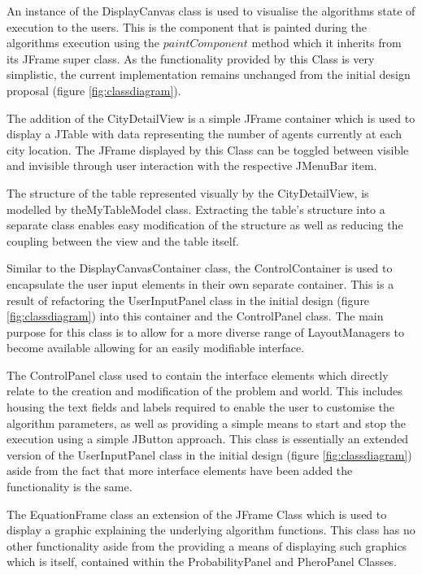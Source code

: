 An instance of the DisplayCanvas class is used to visualise the algorithms state of execution to the users. This is the component that is painted during the algorithms execution using the $paintComponent$ method which it inherits from its JFrame super class. As the functionality provided by this Class is very simplistic, the current implementation remains unchanged from the initial design proposal (figure \ref{fig:classdiagram}).

The addition of the CityDetailView is a simple JFrame container which is used to display a JTable with data representing the number of agents currently at each city location. The JFrame displayed by this Class can be toggled between visible and invisible through user interaction with the respective JMenuBar item.

The structure of the table represented visually by the CityDetailView, is modelled by theMyTableModel class. Extracting the table’s structure into a separate class enables easy modification of the structure as well as reducing the coupling between the view and the table itself.

Similar to the DisplayCanvasContainer class, the ControlContainer is used to encapsulate the user input elements in their own separate container. This is a result of refactoring the UserInputPanel class in the initial design (figure \ref{fig:classdiagram}) into this container and the ControlPanel class. The main purpose for this class is to allow for a more diverse range of LayoutManagers to become available allowing for an easily modifiable interface.

The ControlPanel class used to contain the interface elements which directly relate to the creation and modification of the problem and world. This includes housing the text fields and labels required to enable the user to customise the algorithm parameters, as well as providing a simple means to start and stop the execution using a simple JButton approach. This class is essentially an extended version of the UserInputPanel class in the initial design (figure \ref{fig:classdiagram}) aside from the fact that more interface elements have been added the functionality is the same.

The EquationFrame class an extension of the JFrame Class which is used to display a graphic explaining the underlying algorithm functions. This class has no other functionality aside from the providing a means of displaying such graphics which is itself, contained within the ProbabilityPanel and PheroPanel Classes.

